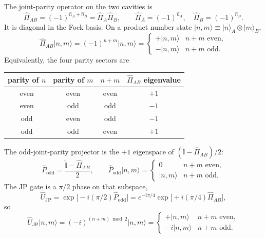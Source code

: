 \documentclass[11pt]{article}
\newcommand{\Ujp}{\hat{U}_{\mathrm{JP}}}
\newcommand{\Pab}{\hat{\Pi}_{AB}}
\begin{document}
The joint-parity operator on the two cavities is
\begin{equation}
\Pab
=(-1)^{\hat{n}_A+\hat{n}_B}
=\hat{\Pi}_A\hat{\Pi}_B,
\qquad
\hat{\Pi}_A=(-1)^{\hat{n}_A},\quad
\hat{\Pi}_B=(-1)^{\hat{n}_B}.
\end{equation}
It is diagonal in the Fock basis.  On a product number state
$\lvert n,m\rangle\equiv\lvert n\rangle_A\otimes\lvert m\rangle_B$,
\begin{equation}
\Pab\lvert n,m\rangle
=(-1)^{n+m}\lvert n,m\rangle
=
\begin{cases}
+\lvert n,m\rangle & n+m\text{ even},\\
-\lvert n,m\rangle & n+m\text{ odd}.
\end{cases}
\end{equation}
Equivalently, the four parity sectors are
\begin{center}
\small
\begin{tabular}{cccc}
\toprule
parity of $n$ & parity of $m$ & $n+m$ & $\Pab$ eigenvalue\\
\midrule
even & even & even & $+1$\\
even & odd  & odd  & $-1$\\
odd  & even & odd  & $-1$\\
odd  & odd  & even & $+1$\\
\bottomrule
\end{tabular}
\end{center}
The odd-joint-parity projector is the $+1$ eigenspace of
$(\hat{\mathbb{I}}-\Pab)/2$:
\begin{equation}
\hat{P}_{\mathrm{odd}}
=\frac{\hat{\mathbb{I}}-\Pab}{2},\qquad
\hat{P}_{\mathrm{odd}}\lvert n,m\rangle
=
\begin{cases}
0 & n+m\text{ even},\\
\lvert n,m\rangle & n+m\text{ odd}.
\end{cases}
\end{equation}
The JP gate is a $\pi/2$ phase on that subspace,
\begin{equation}
\boxed{
\Ujp
=\exp\!\bigl[-i(\pi/2)\hat{P}_{\mathrm{odd}}\bigr]
=e^{-i\pi/4}\exp\!\bigl[+i(\pi/4)\Pab\bigr],
}
\label{eq:jp}
\end{equation}
so
\begin{equation}
\Ujp\lvert n,m\rangle
=(-i)^{(n+m)\bmod 2}\lvert n,m\rangle
=
\begin{cases}
+\lvert n,m\rangle & n+m\text{ even},\\
-i\lvert n,m\rangle & n+m\text{ odd}.
\end{cases}
\end{equation}
\end{document}
